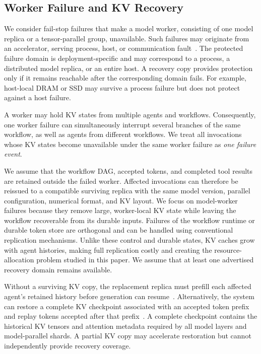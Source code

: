 \subsection{Worker Failure and KV Recovery} \label{sec:background:recovery} 


We consider fail-stop failures that make a model worker, consisting of one model replica or a tensor-parallel group, unavailable. Such failures may originate from an accelerator, serving process, host, or communication fault~\cite{cao2026lumen,jayakody2026ghostserve}. The protected failure domain is deployment-specific and may correspond to a process, a distributed model replica, or an entire host. A recovery copy provides protection only if it remains reachable after the corresponding domain fails. For example, host-local DRAM or SSD may survive a process failure but does not protect against a host failure. 

A worker may hold KV states from multiple agents and workflows. Consequently, one worker failure can simultaneously interrupt several branches of the same workflow, as well as agents from different workflows. We treat all invocations whose KV states become unavailable under the same worker failure as \textit{one failure event}. 

We assume that the workflow DAG, accepted tokens, and completed tool results are retained outside the failed worker. Affected invocations can therefore be reissued to a compatible surviving replica with the same model version, parallel configuration, numerical format, and KV layout. We focus on model-worker failures because they remove large, worker-local KV state while leaving the workflow recoverable from its durable inputs. Failures of the workflow runtime or durable token store are orthogonal and can be handled using conventional replication mechanisms. Unlike these control and durable states, KV caches grow with agent histories, making full replication costly and creating the resource-allocation problem studied in this paper. We assume that at least one advertised recovery domain remains available. 

Without a surviving KV copy, the replacement replica must prefill each affected agent's retained history before generation can resume~\cite{strati2024dejavu}. Alternatively, the system can restore a complete KV checkpoint associated with an accepted token prefix and replay tokens accepted after that prefix~\cite{strati2024dejavu,cao2026lumen}. A complete checkpoint contains the historical KV tensors and attention metadata required by all model layers and model-parallel shards. A partial KV copy may accelerate restoration but cannot independently provide recovery coverage.
